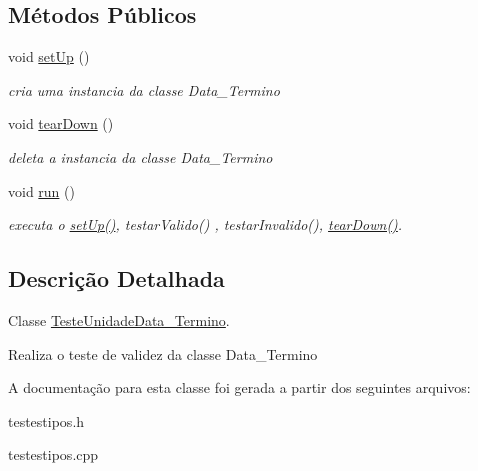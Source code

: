 \subsection*{\-Métodos \-Públicos}
\begin{DoxyCompactItemize}
\item 
\hypertarget{class_teste_unidade_data___termino_a0c6693f95f1b90b068e2cab6c9889662}{
void \hyperlink{class_teste_unidade_data___termino_a0c6693f95f1b90b068e2cab6c9889662}{set\-Up} ()}
\label{class_teste_unidade_data___termino_a0c6693f95f1b90b068e2cab6c9889662}

\begin{DoxyCompactList}\small\item\em cria uma instancia da classe \-Data\-\_\-\-Termino \end{DoxyCompactList}\item 
\hypertarget{class_teste_unidade_data___termino_a02bc5c95c16c1de7dcfd63f9d59e36d3}{
void \hyperlink{class_teste_unidade_data___termino_a02bc5c95c16c1de7dcfd63f9d59e36d3}{tear\-Down} ()}
\label{class_teste_unidade_data___termino_a02bc5c95c16c1de7dcfd63f9d59e36d3}

\begin{DoxyCompactList}\small\item\em deleta a instancia da classe \-Data\-\_\-\-Termino \end{DoxyCompactList}\item 
\hypertarget{class_teste_unidade_data___termino_a9c59cd926ba305c855ed5e476445e6f4}{
void \hyperlink{class_teste_unidade_data___termino_a9c59cd926ba305c855ed5e476445e6f4}{run} ()}
\label{class_teste_unidade_data___termino_a9c59cd926ba305c855ed5e476445e6f4}

\begin{DoxyCompactList}\small\item\em executa o \hyperlink{class_teste_unidade_data___termino_a0c6693f95f1b90b068e2cab6c9889662}{set\-Up()}, testar\-Valido() , testar\-Invalido(), \hyperlink{class_teste_unidade_data___termino_a02bc5c95c16c1de7dcfd63f9d59e36d3}{tear\-Down()}. \end{DoxyCompactList}\end{DoxyCompactItemize}


\subsection{\-Descrição \-Detalhada}
\-Classe \hyperlink{class_teste_unidade_data___termino}{\-Teste\-Unidade\-Data\-\_\-\-Termino}. 

\-Realiza o teste de validez da classe \-Data\-\_\-\-Termino 

\-A documentação para esta classe foi gerada a partir dos seguintes arquivos\-:\begin{DoxyCompactItemize}
\item 
testestipos.\-h\item 
testestipos.\-cpp\end{DoxyCompactItemize}
